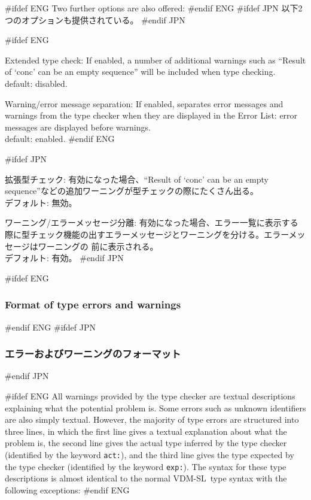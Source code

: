 \documentclass[\pformat,12pt]{article}
\newcommand{\vdmslpp}{VDM-SL}
\newcommand{\vdmslpp}{VDM++}
\newcommand{\guicmd}[1]{{\sf #1}}
\newcommand{\guicmd}[1]{{\gt #1}}
\begin{document}
#ifdef ENG
Two further options are also offered:
#endif ENG
#ifdef JPN
以下2つのオプションも提供されている。
#endif JPN

\begin{list}{}{}
#ifdef ENG
\item[{\sf Extended type check}:] If enabled, a number of additional
  warnings such as ``Result of `conc' can be an empty sequence'' will
  be included when type checking. \\
  default: disabled.

\item[\textsf{Warning/error message separation}:] If enabled,
  separates error messages and warnings from the type checker when
  they are displayed in the \guicmd{Error List}: error messages are
  displayed before warnings.\\
  default: enabled. 
#endif ENG

#ifdef JPN
\item[{\sf 拡張型チェック}:]  有効になった場合、“Result of ‘conc’ 
  can be an empty sequence”などの追加ワーニングが型チェックの際にたくさん出る。\\
  デフォルト: 無効。

\item[\textsf{ワーニング/エラーメッセージ分離}:] 有効になった場合、エラー一覧に表示する
  際に型チェック機能の出すエラーメッセージとワーニングを分ける。エラーメッセージはワーニングの
  前に表示される。\\
  デフォルト: 有効。
#endif JPN
\end{list}


#ifdef ENG
\subsubsection{Format of type errors and warnings}\label{subsub:tcerr}
#endif ENG
#ifdef JPN
\subsubsection{エラーおよびワーニングのフォーマット}\label{subsub:tcerr}
#endif JPN

#ifdef ENG
All warnings provided by the type checker are textual descriptions
explaining what the potential problem is. Some errors such as unknown
identifiers are also simply textual. However, the majority of type
errors are structured into three lines, in which the first line gives
a textual explanation about what the problem is, the second line gives
the actual type inferred by the type checker (identified by the keyword
\texttt{act:}), and the third line gives the type expected by the type
checker (identified by the keyword \texttt{exp:}). The syntax for these
type descriptions is almost identical to the normal \vdmslpp\ type syntax
with the following exceptions:
#endif ENG
\end{document}

